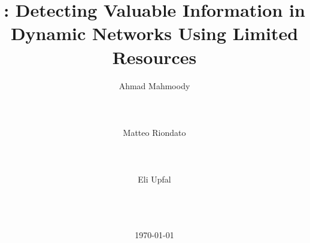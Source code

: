 \documentclass{sig-alternate-2013}
\newif\ifacmstyle
\begin{document}
\ifacmstyle
\newfont{\mycrnotice}{ptmr8t at 7pt}
\newfont{\myconfname}{ptmri8t at 7pt}
\let\crnotice\mycrnotice%
\let\confname\myconfname%


\CopyrightYear{2016}
\permission{Permission to make digital or hard copies of all or part of this
work for personal or classroom use is granted without fee provided that copies
are not made or distributed for profit or commercial advantage and that copies
bear this notice and the full citation on the first page. Copyrights for
components of this work owned by others than ACM must be honored. Abstracting
with credit is permitted. To copy otherwise, or republish, to post on servers or
to redistribute to lists, requires prior specific permission and/or a fee.
Request permissions from Permissions@acm.org.}
\conferenceinfo{WSDM'16,}{February 22--25, 2016, San Francisco, CA, USA}
\copyrightetc{\copyright~2016 ACM. ISBN \the\acmcopyr}
\crdata{XXX-X-XXXX-XXXX-X/16/02\ ...\$15.00.\\
DOI: http://dx.doi.org/XX.XXXX/XXXXXXX.XXXXXXX
}

\clubpenalty=10000
\widowpenalty = 10000
\fi

\title{\algonamebasecap: Detecting Valuable Information in Dynamic Networks Using Limited Resources}

\author{
\alignauthor
Ahmad Mahmoody\\
\\
\\
\\
\alignauthor
Matteo Riondato\\
\\
\\
\\
\alignauthor
Eli Upfal\\
\\
\\
\\
}

\date{\today}

\maketitle
\end{document}

